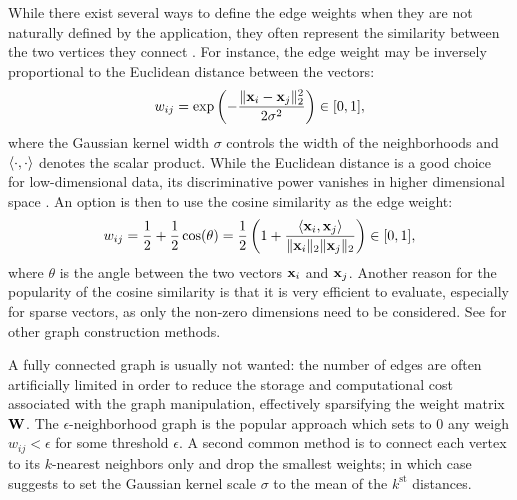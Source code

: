 While there exist several ways to define the edge weights when they are not naturally defined by the application, they often represent the similarity between the two vertices they connect \cite{pierre2013graphs}. For instance, the edge weight may be inversely proportional to the Euclidean distance between the vectors:
\begin{equation}
	w_{ij} = \exp \left( - \frac{\| \mathbf{x}_i - \mathbf{x}_j \|_2^2}{2\sigma^2} \right) \in [0,1],
\end{equation}
where the Gaussian kernel width $\sigma$ controls the width of the neighborhoods and $\langle \cdot , \cdot \rangle$ denotes the scalar product. While the Euclidean distance is a good choice for low-dimensional data, its discriminative power vanishes in higher dimensional space \cite{aggarwal2001highDimDistance, domingos2012pitfallsML}. An option is then to use the cosine similarity as the edge weight:
\begin{equation}
	w_{ij} = \frac{1}{2} + \frac{1}{2} \cos(\theta) = \frac{1}{2} \left(1 + \frac{\langle \mathbf{x}_i , \mathbf{x}_j \rangle}{\|\mathbf{x}_i\|_2 \|\mathbf{x}_j\|_2} \right) \in [0,1],
\end{equation}
where $\theta$ is the angle between the two vectors $\mathbf{x}_i$ and $\mathbf{x}_j$. Another reason for the popularity of the cosine similarity is that it is very efficient to evaluate, especially for sparse vectors, as only the non-zero dimensions need to be considered. See \cite{grady2010graphs} for other graph
construction methods.

A fully connected graph is usually not wanted: the number of edges are often artificially limited in order to reduce the storage and computational cost associated with the graph manipulation, effectively sparsifying the weight matrix $\mathbf{W}$.
The $\epsilon$-neighborhood graph is the popular approach which sets to 0 any weigh $w_{ij} < \epsilon$ for some threshold $\epsilon$.
A second common method is to connect each vertex to its $k$-nearest neighbors only and drop the smallest weights; in which case \cite{zelnik2004scale} suggests to set the Gaussian kernel scale $\sigma$ to the mean of the $k^{\text{st}}$ distances.

